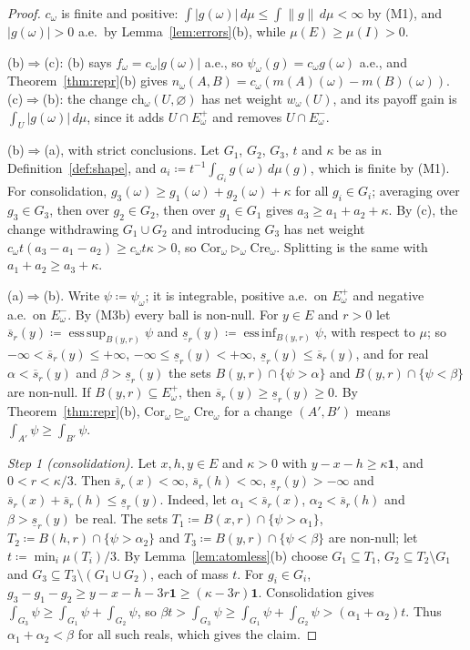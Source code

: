 \documentclass[11pt]{article}
\theoremstyle{definition}
\newcommand{\one}{\mathbf 1}
\newcommand{\Cor}{\mathrm{Cor}}
\newcommand{\Cre}{\mathrm{Cre}}
\newcommand{\ch}{\mathrm{ch}}
\newcommand{\Ep}{E^{+}}
\newcommand{\Em}{E^{-}}
\newcommand{\sge}{\trianglerighteq}
\newcommand{\sgt}{\triangleright}
\DeclareMathOperator*{\esssup}{ess\,sup}
\DeclareMathOperator*{\essinf}{ess\,inf}
\begin{document}
\begin{proof}
$c_\omega$ is finite and positive: $\int|g(\omega)|\,d\mu\le\int\|g\|\,d\mu<\infty$ by (M1), and $|g(\omega)|>0$ a.e.\ by Lemma~\ref{lem:errors}(b), while $\mu(E)\ge\mu(I)>0$.

(b)$\Rightarrow$(c): (b) says $f_\omega=c_\omega|g(\omega)|$ a.e., so $\psi_\omega(g)=c_\omega g(\omega)$ a.e., and Theorem~\ref{thm:repr}(b) gives $n_\omega(A,B)=c_\omega(m(A)(\omega)-m(B)(\omega))$. (c)$\Rightarrow$(b): the change $\ch_\omega(U,\varnothing)$ has net weight $w_\omega(U)$, and its payoff gain is $\int_U|g(\omega)|\,d\mu$, since it adds $U\cap\Ep_\omega$ and removes $U\cap\Em_\omega$.

(b)$\Rightarrow$(a), with strict conclusions. Let $G_1$, $G_2$, $G_3$, $t$ and $\kappa$ be as in Definition~\ref{def:shape}, and $a_i\coloneqq t^{-1}\int_{G_i}g(\omega)\,d\mu(g)$, which is finite by (M1). For consolidation, $g_3(\omega)\ge g_1(\omega)+g_2(\omega)+\kappa$ for all $g_i\in G_i$; averaging over $g_3\in G_3$, then over $g_2\in G_2$, then over $g_1\in G_1$ gives $a_3\ge a_1+a_2+\kappa$. By (c), the change withdrawing $G_1\cup G_2$ and introducing $G_3$ has net weight $c_\omega t(a_3-a_1-a_2)\ge c_\omega t\kappa>0$, so $\Cor_\omega\sgt_\omega\Cre_\omega$. Splitting is the same with $a_1+a_2\ge a_3+\kappa$.

(a)$\Rightarrow$(b). Write $\psi\coloneqq\psi_\omega$; it is integrable, positive a.e.\ on $\Ep_\omega$ and negative a.e.\ on $\Em_\omega$. By (M3b) every ball is non-null. For $y\in E$ and $r>0$ let $\overline s_r(y)\coloneqq\esssup_{B(y,r)}\psi$ and $\underline s_r(y)\coloneqq\essinf_{B(y,r)}\psi$, with respect to $\mu$; so $-\infty<\overline s_r(y)\le+\infty$, $-\infty\le \underline s_r(y)<+\infty$, $\underline s_r(y)\le \overline s_r(y)$, and for real $\alpha<\overline s_r(y)$ and $\beta>\underline s_r(y)$ the sets $B(y,r)\cap\{\psi>\alpha\}$ and $B(y,r)\cap\{\psi<\beta\}$ are non-null. If $B(y,r)\subseteq\Ep_\omega$, then $\overline s_r(y)\ge \underline s_r(y)\ge0$. By Theorem~\ref{thm:repr}(b), $\Cor_\omega\sge_\omega\Cre_\omega$ for a change $(A',B')$ means $\int_{A'}\psi\ge\int_{B'}\psi$.

\emph{Step 1 (consolidation).} Let $x,h,y\in E$ and $\kappa>0$ with $y-x-h\ge\kappa\one$, and $0<r<\kappa/3$. Then $\overline s_r(x)<\infty$, $\overline s_r(h)<\infty$, $\underline s_r(y)>-\infty$ and $\overline s_r(x)+\overline s_r(h)\le \underline s_r(y)$. Indeed, let $\alpha_1<\overline s_r(x)$, $\alpha_2<\overline s_r(h)$ and $\beta>\underline s_r(y)$ be real. The sets $T_1\coloneqq B(x,r)\cap\{\psi>\alpha_1\}$, $T_2\coloneqq B(h,r)\cap\{\psi>\alpha_2\}$ and $T_3\coloneqq B(y,r)\cap\{\psi<\beta\}$ are non-null; let $t\coloneqq\min_i\mu(T_i)/3$. By Lemma~\ref{lem:atomless}(b) choose $G_1\subseteq T_1$, $G_2\subseteq T_2\setminus G_1$ and $G_3\subseteq T_3\setminus(G_1\cup G_2)$, each of mass $t$. For $g_i\in G_i$, $g_3-g_1-g_2\ge y-x-h-3r\one\ge(\kappa-3r)\one$. Consolidation gives $\int_{G_3}\psi\ge\int_{G_1}\psi+\int_{G_2}\psi$, so $\beta t>\int_{G_3}\psi\ge\int_{G_1}\psi+\int_{G_2}\psi>(\alpha_1+\alpha_2)t$. Thus $\alpha_1+\alpha_2<\beta$ for all such reals, which gives the claim.


\end{proof}
\end{document}
